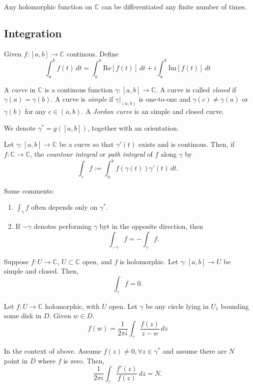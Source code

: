 
\begin{thm}
	Any holomorphic function on $\mathbb{C}$ can be differentiated any finite number of times.
\end{thm}

\subsection{Integration}

\begin{defn}
	Given $f: [a, b] \to \mathbb{C}$ continous. Define \[
		\int_a^b f(t) \,d{t} = \int_a^b \mathrm{Re}[f(t)] \,dt + i \int_a^b \mathrm{Im}[f(t)] \,dt
	\]
\end{defn}

\begin{defn}[Curve]
	A \emph{curve} in $\mathbb{C}$ is a continous function $\gamma: [a, b] \to \mathbb{C}$. A curve is called \emph{closed} if $\gamma(a) = \gamma(b)$. A curve is \emph{simple} if $\gamma\big|_{(a, b)}$ is one-to-one and $\gamma(c) \neq \gamma(a)$ or $\gamma(b)$ for any $c \in (a, b)$. A \emph{Jordan curve} is an simple and closed curve.

	We denote $\gamma^* = g([a, b])$, together with an orientation.
\end{defn}

\begin{defn}
	Let $\gamma: [a, b] \to \mathbb{C}$ be a curve so that $\gamma'(t)$ exists and is continous.
	Then, if  $f: \mathbb{C} \to \mathbb{C}$, the \emph{countour integral} or \emph{path integral} of $f$ along $\gamma$ by \[
		\int_\gamma f := \int_a^b f(\gamma(t)) \gamma'(t) \,dt.
	\]
\end{defn}

Some comments:
\begin{enumerate}
	\item $\int_\gamma f$ often depends only on $\gamma^*$.
	\item If $-\gamma$ denotes performing $\gamma$ byt in the opposite direction, then \[
			\int_{-\gamma} f = -\int_{\gamma} f.
	\]
\end{enumerate}

\begin{thm}
	Suppose $f: U \to \mathbb{C}$, $U \subset \mathbb{C}$ open, and $f$ is holomorphic. Let $\gamma: [a, b] \to U$ be simple and closed. Then, \[
		\int_\gamma f = 0.
	\]
\end{thm}

\begin{thm}
	Let $f: U \to \mathbb{C}$ holomorphic, with $U$ open. Let $\gamma$ be any circle lying in $U_1$ bounding some disk in $D$. Given $w \in D$. \[
		f(w) = \frac{1}{2\pi i}\int_\gamma \frac{f(z)}{z-w} \,dz
	\]
\end{thm}

\begin{thm}
	In the context of above. Assume $f(z) \neq 0, \forall z \in \gamma^*$ and assume there are $N$ point in $D$ where $f$ is zero. Then, \[
		\frac{1}{2 \pi i} \int_\gamma \frac{f'(z)}{f(z)} \,dz = N.
	\]
\end{thm}

